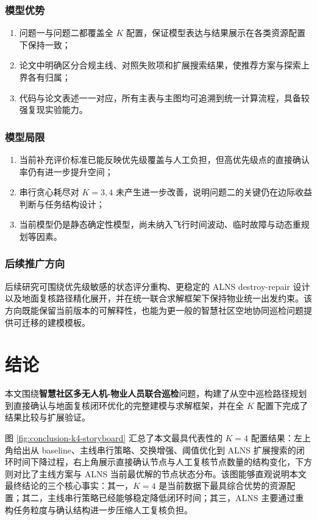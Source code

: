 \documentclass[12pt]{article}
\begin{document}
\subsubsection{模型优势}
\begin{enumerate}
	\item 问题一与问题二都覆盖全 $K$ 配置，保证模型表达与结果展示在各类资源配置下保持一致；
	\item 论文中明确区分合规主线、对照失败项和扩展搜索结果，使推荐方案与探索上界各有归属；
	\item 代码与论文表述一一对应，所有主表与主图均可追溯到统一计算流程，具备较强复现实验能力。
\end{enumerate}

\subsubsection{模型局限}
\begin{enumerate}
	\item 当前补充评价标准已能反映优先级覆盖与人工负担，但高优先级点的直接确认率仍有进一步提升空间；
	\item 串行贪心耗尽对 $K=3,4$ 未产生进一步改善，说明问题二的关键仍在边际收益判断与任务结构设计；
	\item 当前模型仍是静态确定性模型，尚未纳入飞行时间波动、临时故障与动态重规划等因素。
\end{enumerate}

\subsubsection{后续推广方向}
后续研究可围绕优先级敏感的状态评分重构、更稳定的 ALNS destroy-repair 设计以及地面复核路径精化展开，并在统一联合求解框架下保持物业统一出发约束。该方向既能保留当前版本的可解释性，也能为更一般的智慧社区空地协同巡检问题提供可迁移的建模模板。

\section{结论}
本文围绕\textbf{智慧社区多无人机-物业人员联合巡检}问题，构建了从空中巡检路径规划到直接确认与地面复核闭环优化的完整建模与求解框架，并在全 $K$ 配置下完成了结果比较与扩展验证。

图 \ref{fig:conclusion-k4-storyboard} 汇总了本文最具代表性的 $K=4$ 配置结果：左上角给出从 baseline、主线串行策略、交换增强、阈值优化到 ALNS 扩展搜索的闭环时间下降过程，右上角展示直接确认节点与人工复核节点数量的结构变化，下方则对比了主线方案与 ALNS 当前最优解的节点状态分布。该图能够直观说明本文最终结论的三个核心事实：其一，$K=4$ 是当前数据下最具综合优势的资源配置；其二，主线串行策略已经能够稳定降低闭环时间；其三，ALNS 主要通过重构任务粒度与确认结构进一步压缩人工复核负担。
\end{document}
